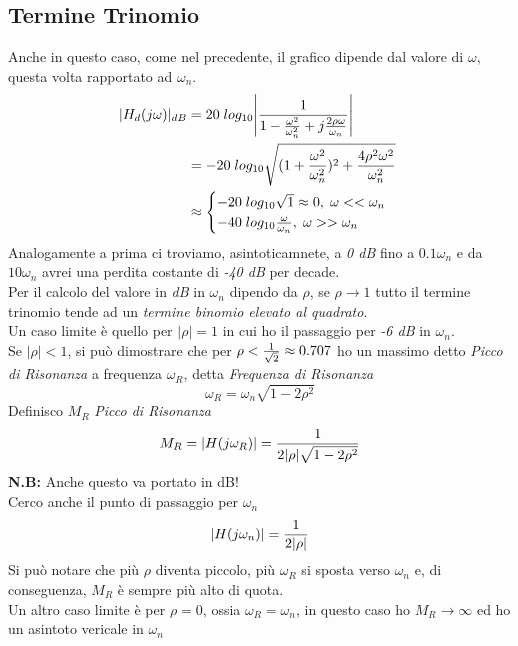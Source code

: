 \documentclass{article}
\begin{document}
		\subsection{Termine Trinomio}
			Anche in questo caso, come nel precedente, il grafico dipende dal valore di $ \omega $, questa volta rapportato ad $ \omega_n $.
			\[
				\begin{aligned}
					\vert H_d(j\omega) \vert_{dB} &= 20\; log_{10}\Bigg\vert {1\over{1 - {\omega^2\over{\omega_n^2}} + j{{2\rho\omega}\over{\omega_n}} }} \Bigg\vert \\
					&= -20\; log_{10}\sqrt{(1 + {\omega^2\over{\omega_n^2}})^2 + {{4\rho^2\omega^2\over{\omega_n^2}}}} \\
					&\approx \begin{cases}
						-20\; log_{10}\sqrt{1} \approx 0,\; \omega << \omega_n \\
						-40\; log_{10}{\omega\over{\omega_n}},\; \omega >> \omega_n
					\end{cases}
				\end{aligned}
			\]
			Analogamente a prima ci troviamo, asintoticamnete, a \textit{0 dB} fino a $ 0.1\omega_n $ e da $ 10\omega_n $ avrei una perdita costante di \textit{-40 dB} per decade. \\
			Per il calcolo del valore in \textit{dB} in $ \omega_n $ dipendo da $ \rho $, se $ \rho \to 1 $ tutto il termine trinomio tende ad un \textit{termine binomio elevato al quadrato}. \\
			Un caso limite è quello per $ \vert \rho \vert = 1 $ in cui ho il passaggio per \textit{-6 dB} in $ \omega_n $. \\
			Se $ \vert \rho \vert < 1 $, si può dimostrare che per $ \rho < {1\over{\sqrt{2}}} \approx 0.707 $ ho un massimo detto \textit{Picco di Risonanza} a frequenza $ \omega_R $, detta \textit{Frequenza di Risonanza}
			\[
				\omega_R = \omega_n \sqrt{1 - 2\rho^2}
			\]
			Definisco $ M_R $ \textit{Picco di Risonanza}
			\[
				M_R = \vert H(j\omega_R) \vert = {1\over{2\vert \rho \vert \sqrt{1 - 2\rho^2}}}
			\]
			\textbf{N.B:} Anche questo va portato in dB!\\
			Cerco anche il punto di passaggio per $ \omega_n $
			\[
				\vert H(j\omega_n) \vert = {1\over{2\vert \rho \vert}}
			\]
			Si può notare che più $ \rho $ diventa piccolo, più $ \omega_R $ si sposta verso $ \omega_n $ e, di conseguenza, $ M_R $ è sempre più alto di quota. \\
			Un altro caso limite è per $ \rho = 0 $, ossia $ \omega_R = \omega_n $, in questo caso ho $ M_R \to \infty $ ed ho un asintoto vericale in $ \omega_n $ \\
\end{document}
